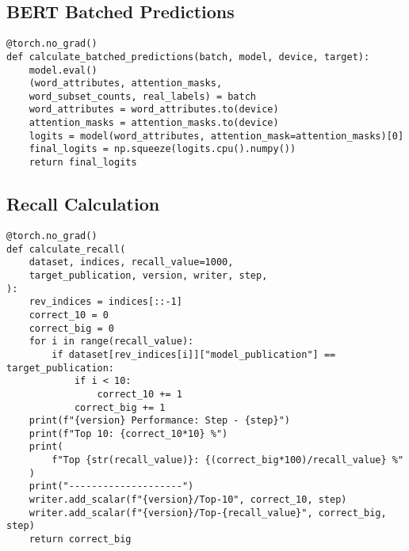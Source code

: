 \subsection{BERT Batched Predictions}
\begin{verbatim}
@torch.no_grad()
def calculate_batched_predictions(batch, model, device, target):
    model.eval()
    (word_attributes, attention_masks, 
    word_subset_counts, real_labels) = batch
    word_attributes = word_attributes.to(device)
    attention_masks = attention_masks.to(device)
    logits = model(word_attributes, attention_mask=attention_masks)[0]
    final_logits = np.squeeze(logits.cpu().numpy())
    return final_logits
\end{verbatim}

\subsection{Recall Calculation}
\begin{verbatim}
@torch.no_grad()
def calculate_recall(
    dataset, indices, recall_value=1000, 
    target_publication, version, writer, step,
):
    rev_indices = indices[::-1]
    correct_10 = 0
    correct_big = 0
    for i in range(recall_value):
        if dataset[rev_indices[i]]["model_publication"] == target_publication:
            if i < 10:
                correct_10 += 1
            correct_big += 1
    print(f"{version} Performance: Step - {step}")
    print(f"Top 10: {correct_10*10} %")
    print(
        f"Top {str(recall_value)}: {(correct_big*100)/recall_value} %"
    )
    print("--------------------")
    writer.add_scalar(f"{version}/Top-10", correct_10, step)
    writer.add_scalar(f"{version}/Top-{recall_value}", correct_big, step)
    return correct_big
\end{verbatim}